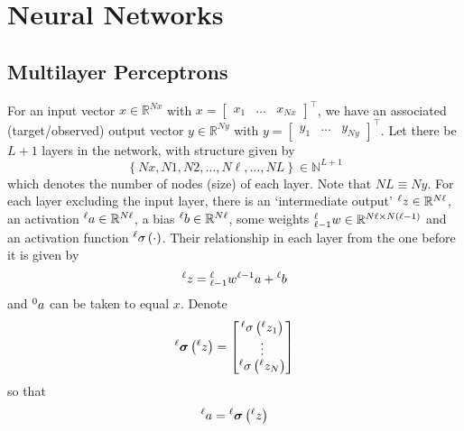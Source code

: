 \documentclass[11pt]{report} %
\begin{document}
\section{Neural Networks}

\subsection{Multilayer Perceptrons}

For an input vector $x\in\mathbb{R}^{Nx}$ with $x=\begin{bmatrix}x_{1} & \dots & x_{Nx}\end{bmatrix}^{\top}$, we have an associated (target/observed) output vector $y\in\mathbb{R}^{Ny}$ with $y=\begin{bmatrix}y_{1} & \dots & y_{Ny}\end{bmatrix}^{\top}$. Let there be $L + 1$ layers in the network, with structure given by
\begin{equation}
\left\{Nx,N1,N2,\dots,N\ell,\dots,NL\right\} \in \mathbb{N}^{L + 1}
\end{equation}
which denotes the number of nodes (size) of each layer. Note that $NL\equiv Ny$. For each layer excluding the input layer, there is an `intermediate output' $\mathstrut^{\ell}z\in\mathbb{R}^{N\ell}$, an activation $\mathstrut^{\ell}a\in\mathbb{R}^{N\ell}$, a bias $\mathstrut^{\ell}b\in\mathbb{R}^{N\ell}$, some weights $\mathstrut_{\ell-1}^{\ell}w\in\mathbb{R}^{N\ell\times N\left(\ell-1\right)}$ and an activation function $\mathstrut^{\ell}\sigma\left(\cdot\right)$. Their relationship in each layer from the one before it is given by
\begin{equation}
\mathstrut^{\ell}z=\mathstrut_{\ell-1}^{\ell}w\mathstrut^{\ell-1}a+\mathstrut^{\ell}b
\end{equation}
and $\mathstrut^{0}a$ can be taken to equal $x$. Denote
\begin{equation}
\mathstrut^{\ell}\boldsymbol{\sigma}\left(\mathstrut^{\ell}z\right)=\begin{bmatrix}\mathstrut^{\ell}\sigma\left(\mathstrut^{\ell} z_{1}\right)\\
\vdots\\
\mathstrut^{\ell}\sigma\left(\mathstrut^{\ell}z_{N}\right)
\end{bmatrix}
\end{equation}
so that
\begin{equation}
\mathstrut^{\ell}a=\mathstrut^{\ell}\boldsymbol{\sigma}\left(\mathstrut^{\ell}z\right)
\end{equation}
\end{document}
